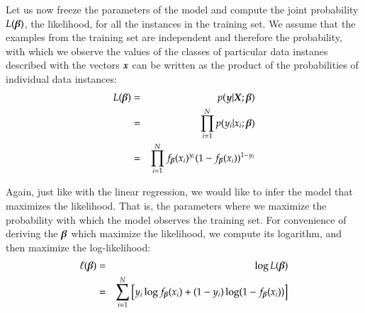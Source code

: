 \begin{refsection}
Let us now freeze the parameters of the model and compute the joint probability $L(\boldsymbol{\beta})$, the likelihood, for all the instances in the training set. We assume that the examples from the training set are independent and therefore the probability, with which we observe the values of the classes of particular data instanes described with the vectors $\boldsymbol{x}$ can be written as the product of the probabilities of individual data instances:
\begin{eqnarray}
  L(\boldsymbol{\beta}) & = & p(\boldsymbol{y}|\boldsymbol{X};\boldsymbol{\beta}) \nonumber\\
  & = & \prod_{i=1}^N p(y_i|x_i;\boldsymbol{\beta}) \nonumber\\
  & = & \prod_{i=1}^N f_{\boldsymbol{\beta}}(x_i)^{y_i}(1-f_{\boldsymbol{\beta}}(x_i))^{1-y_i}
\end{eqnarray}

Again, just like with the linear regression, we would like to infer the model that maximizes the likelihood. That is, the parameters where we maximize the probability with which the model observes the training set. For convenience of deriving the $\boldsymbol{\beta}$ which maximize the likelihood, we compute its logarithm, and then maximize the log-likelihood:
\begin{eqnarray}
  \ell(\boldsymbol{\beta}) & = & \log L(\boldsymbol{\beta}) \nonumber\\
  & = & \sum_{i=1}^N\big[y_i\log f_{\boldsymbol{\beta}}(x_i)+(1-y_i)\log (1-f_{\boldsymbol{\beta}}(x_i)) \big]
\end{eqnarray}


\end{refsection}
